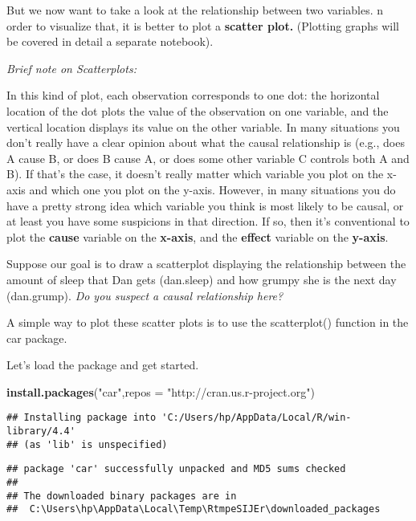 \documentclass[
]{article}
\newenvironment{Shaded}{\begin{snugshade}}{\end{snugshade}}
\newcommand{\AttributeTok}[1]{\textcolor[rgb]{0.13,0.29,0.53}{#1}}
\newcommand{\FunctionTok}[1]{\textcolor[rgb]{0.13,0.29,0.53}{\textbf{#1}}}
\newcommand{\NormalTok}[1]{#1}
\newcommand{\StringTok}[1]{\textcolor[rgb]{0.31,0.60,0.02}{#1}}
\begin{document}
But we now want to take a look at the relationship between two
variables. n order to visualize that, it is better to plot a
\textbf{scatter plot.} (Plotting graphs will be covered in detail a
separate notebook).

\emph{Brief note on Scatterplots:}

In this kind of plot, each observation corresponds to one dot: the
horizontal location of the dot plots the value of the observation on one
variable, and the vertical location displays its value on the other
variable. In many situations you don't really have a clear opinion about
what the causal relationship is (e.g., does A cause B, or does B cause
A, or does some other variable C controls both A and B). If that's the
case, it doesn't really matter which variable you plot on the x-axis and
which one you plot on the y-axis. However, in many situations you do
have a pretty strong idea which variable you think is most likely to be
causal, or at least you have some suspicions in that direction. If so,
then it's conventional to plot the \textbf{cause} variable on the
\textbf{x-axis}, and the \textbf{effect} variable on the
\textbf{y-axis}.

Suppose our goal is to draw a scatterplot displaying the relationship
between the amount of sleep that Dan gets (dan.sleep) and how grumpy she
is the next day (dan.grump). \emph{Do you suspect a causal relationship
here?}

A simple way to plot these scatter plots is to use the scatterplot()
function in the car package.

Let's load the package and get started.

\begin{Shaded}
\begin{Highlighting}[]
\FunctionTok{install.packages}\NormalTok{(}\StringTok{"car"}\NormalTok{,}\AttributeTok{repos =} \StringTok{"http://cran.us.r{-}project.org"}\NormalTok{)}
\end{Highlighting}
\end{Shaded}

\begin{verbatim}
## Installing package into 'C:/Users/hp/AppData/Local/R/win-library/4.4'
## (as 'lib' is unspecified)
\end{verbatim}

\begin{verbatim}
## package 'car' successfully unpacked and MD5 sums checked
## 
## The downloaded binary packages are in
##  C:\Users\hp\AppData\Local\Temp\RtmpeSIJEr\downloaded_packages
\end{verbatim}
\end{document}

